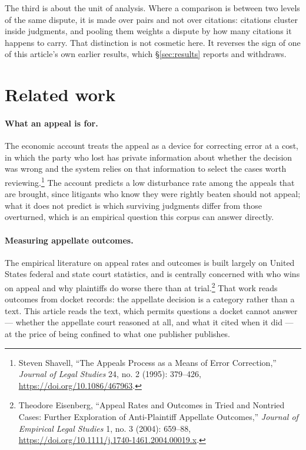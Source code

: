 \documentclass[11pt]{article}
\begin{document}
The third is about the unit of analysis. Where a comparison is between two
levels of the same dispute, it is made over pairs and not over citations: citations
cluster inside judgments, and pooling them weights a dispute by how many
citations it happens to carry. That distinction is not cosmetic here. It
reverses the sign of one of this article's own earlier results, which
§\ref{sec:results} reports and withdraws.

\section{Related work}
\label{sec:related}

\paragraph{What an appeal is for.} The economic account treats the appeal as
a device for correcting error at a cost, in which the party who lost has
private information about whether the decision was wrong and the system
relies on that information to select the cases worth reviewing.\footnote{%
Steven Shavell, ``The Appeals Process as a Means of Error Correction,''
\emph{Journal of Legal Studies} 24, no. 2 (1995): 379--426,
\url{https://doi.org/10.1086/467963}.} The account predicts a low disturbance rate among the appeals that are
brought, since litigants who know they were rightly beaten should not appeal;
what it does not predict is which surviving judgments differ from those
overturned, which is an empirical question this corpus can answer directly.

\paragraph{Measuring appellate outcomes.} The empirical literature on appeal
rates and outcomes is built largely on United States federal and state court
statistics, and is centrally concerned with who wins on appeal and why
plaintiffs do worse there than at trial.\footnote{%
Theodore Eisenberg, ``Appeal Rates and Outcomes in Tried and Nontried Cases:
Further Exploration of Anti-Plaintiff Appellate Outcomes,'' \emph{Journal of
Empirical Legal Studies} 1, no. 3 (2004): 659--88,
\url{https://doi.org/10.1111/j.1740-1461.2004.00019.x}.} That work reads
outcomes from docket records: the appellate decision is a category rather
than a text. This article reads the text, which permits questions a docket
cannot answer --- whether the appellate court reasoned at all, and what it
cited when it did --- at the price of being confined to what one publisher
publishes.
\end{document}
